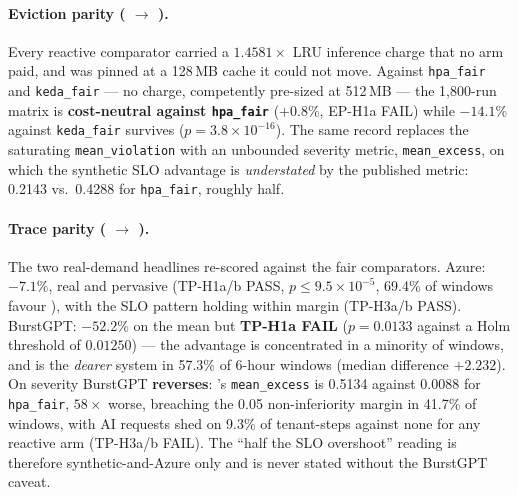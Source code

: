 \paragraph{Eviction parity ( $\to$
).} Every reactive comparator carried
a $1.4581\times$ LRU inference charge that no \jcac{} arm paid, and was
pinned at a 128\,MB cache it could not move. Against \texttt{hpa\_fair} and
\texttt{keda\_fair} --- no charge, competently pre-sized at 512\,MB --- the
1{,}800-run matrix is \textbf{cost-neutral against \texttt{hpa\_fair}}
($+0.8\%$, EP-H1a FAIL) while $-14.1\%$ against \texttt{keda\_fair}
survives ($p{=}3.8{\times}10^{-16}$). The same record replaces the
saturating \texttt{mean\_violation} with an unbounded severity metric,
\texttt{mean\_excess}, on which the synthetic SLO advantage is
\emph{understated} by the published metric: 0.2143 vs.\ 0.4288 for
\texttt{hpa\_fair}, roughly half.

\paragraph{Trace parity ( $\to$
).} The two real-demand headlines
re-scored against the fair comparators. Azure: $-7.1\%$, real and
pervasive (TP-H1a/b PASS, $p \le 9.5{\times}10^{-5}$, 69.4\% of windows
favour \jcac{}), with the SLO pattern holding within margin (TP-H3a/b
PASS). BurstGPT: $-52.2\%$ on the mean but \textbf{TP-H1a FAIL}
($p{=}0.0133$ against a Holm threshold of $0.01250$) --- the advantage is
concentrated in a minority of windows, and \jcac{} is the \emph{dearer}
system in 57.3\% of 6-hour windows (median difference $+2.232$). On
severity BurstGPT \textbf{reverses}: \jcac{}'s \texttt{mean\_excess} is
0.5134 against 0.0088 for \texttt{hpa\_fair}, $58\times$ worse, breaching
the 0.05 non-inferiority margin in 41.7\% of windows, with AI requests shed
on 9.3\% of tenant-steps against none for any reactive arm (TP-H3a/b
FAIL). The ``half the SLO overshoot'' reading is therefore
synthetic-and-Azure only and is never stated without the BurstGPT caveat.

